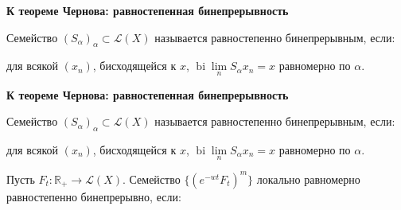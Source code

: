 \documentclass[11pt]{article}
\newcommand{\R}{\mathbb{R}}
\begin{document}
\newpage

\begin{center}
{\color{notaeYELLOW}\bfseries\fontsize{44}{52}\selectfont К теореме Чернова: равностепенная бинепрерывность}
\end{center}
\vspace*{\fill}
\begin{center}
\fontsize{36}{43}\selectfont
\parbox{\linewidth}{\centering\noindent Семейство $(S_\alpha)_\alpha\subset\mathcal{L}(X)$ называется равностепенно бинепрерывным, если:
\par}\vspace{0.4in}
\parbox{\linewidth}{\centering\noindent для всякой $(x_n)$, бисходящейся к $x$, $\operatorname{bi}\lim\limits_n S_\alpha x_n=x$ равномерно по $\alpha$.
\par}\vspace{0.4in}
\end{center}
\vspace*{\fill}

\newpage

\begin{center}
{\color{notaeYELLOW}\bfseries\fontsize{44}{52}\selectfont К теореме Чернова: равностепенная бинепрерывность}
\end{center}
\vspace*{\fill}
\begin{center}
\fontsize{36}{43}\selectfont
\parbox{\linewidth}{\centering\noindent Семейство $(S_\alpha)_\alpha\subset\mathcal{L}(X)$ называется равностепенно бинепрерывным, если:
\par}\vspace{0.4in}
\parbox{\linewidth}{\centering\noindent для всякой $(x_n)$, бисходящейся к $x$, $\operatorname{bi}\lim\limits_n S_\alpha x_n=x$ равномерно по $\alpha$.
\par}\vspace{0.4in}
\parbox{\linewidth}{\centering\noindent Пусть $F_t:\R_+\to\mathcal{L}(X)$. Семейство $\{(e^{-wt}F_t)^m\}$ локально равномерно равностепенно бинепрерывно, если:
\par}\vspace{0.4in}
\end{center}
\vspace*{\fill}

\newpage
\end{document}
